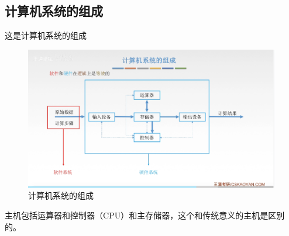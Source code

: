 \documentclass[12pt]{ctexart}
\begin{document}
\subsection{计算机系统的组成}
这是计算机系统的组成
\begin{figure}[htbp]
    \centering
    \includegraphics[scale=0.6]{计算机系统的组成.png}
    \caption{计算机系统的组成}
    \end{figure}
主机包括运算器和控制器（CPU）和主存储器，这个和传统意义的主机是区别的。
\end{document}
